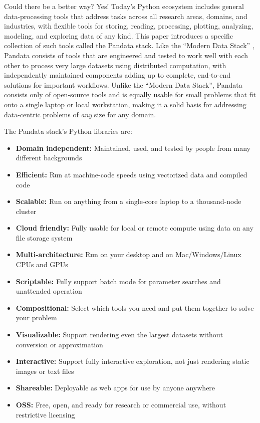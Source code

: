 Could there be a better way? Yes! Today's Python ecosystem includes general data-processing tools that address tasks across all research areas, domains, and industries, with flexible tools for storing, reading, processing, plotting, analyzing, modeling, and exploring data of any kind. This paper introduces a specific collection of such tools called the Pandata stack. Like the ``Modern Data Stack'' \cite{handy:dbtb20,jaipuria:substack22}, Pandata consists of tools that are engineered and tested to work well with each other to process very large datasets using distributed computation, with independently maintained components adding up to complete, end-to-end solutions for important workflows. Unlike the ``Modern Data Stack'', Pandata consists only of open-source tools and is equally usable for small problems that fit onto a single laptop or local workstation, making it a solid basis for addressing data-centric problems of \emph{any} size for any domain.

The Pandata stack's Python libraries are:

\begin{itemize}
  \item\textbf{Domain independent:} Maintained, used, and tested by people from many different backgrounds
  \item\textbf{Efficient:} Run at machine-code speeds using vectorized data and compiled code
  \item\textbf{Scalable:} Run on anything from a single-core laptop to a thousand-node cluster
  \item\textbf{Cloud friendly:} Fully usable for local or remote compute using data on any file storage system
  \item\textbf{Multi-architecture:} Run on your desktop and on Mac/Windows/Linux CPUs and GPUs
  \item\textbf{Scriptable:} Fully support batch mode for parameter searches and unattended operation
  \item\textbf{Compositional:} Select which tools you need and put them together to solve your problem
  \item\textbf{Visualizable:} Support rendering even the largest datasets without conversion or approximation
  \item\textbf{Interactive:} Support fully interactive exploration, not just rendering static images or text files
  \item\textbf{Shareable:} Deployable as web apps for use by anyone anywhere
  \item\textbf{OSS:} Free, open, and ready for research or commercial use, without restrictive licensing
\end{itemize}


